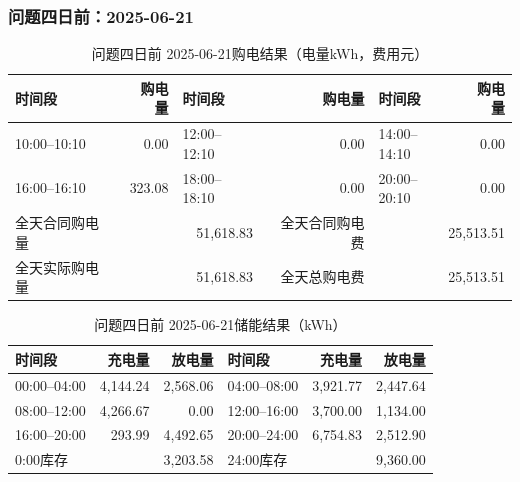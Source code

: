 \par\medskip
\par\noindent\begin{minipage}{\textwidth}
\subsubsection*{问题四日前：2025-06-21}
\begin{table}[H]\centering\small\setlength{\tabcolsep}{4pt}\caption{问题四日前 2025-06-21购电结果（电量kWh，费用元）}
\begin{tabular}{lr lr lr}\toprule
时间段 & 购电量 & 时间段 & 购电量 & 时间段 & 购电量\\\midrule
10:00--10:10 & 0.00 & 12:00--12:10 & 0.00 & 14:00--14:10 & 0.00\\
16:00--16:10 & 323.08 & 18:00--18:10 & 0.00 & 20:00--20:10 & 0.00\\
\midrule
全天合同购电量 & \multicolumn{2}{r}{51,618.83} & 全天合同购电费 & \multicolumn{2}{r}{25,513.51}\\
全天实际购电量 & \multicolumn{2}{r}{51,618.83} & 全天总购电费 & \multicolumn{2}{r}{25,513.51}\\
\bottomrule\end{tabular}\end{table}
\begin{table}[H]\centering\small\setlength{\tabcolsep}{4pt}\caption{问题四日前 2025-06-21储能结果（kWh）}
\begin{tabular}{lrr lrr}\toprule
时间段 & 充电量 & 放电量 & 时间段 & 充电量 & 放电量\\\midrule
00:00--04:00 & 4,144.24 & 2,568.06 & 04:00--08:00 & 3,921.77 & 2,447.64\\
08:00--12:00 & 4,266.67 & 0.00 & 12:00--16:00 & 3,700.00 & 1,134.00\\
16:00--20:00 & 293.99 & 4,492.65 & 20:00--24:00 & 6,754.83 & 2,512.90\\
\midrule
0:00库存 & \multicolumn{2}{r}{3,203.58} & 24:00库存 & \multicolumn{2}{r}{9,360.00}\\
\bottomrule\end{tabular}\end{table}
\end{minipage}\par

